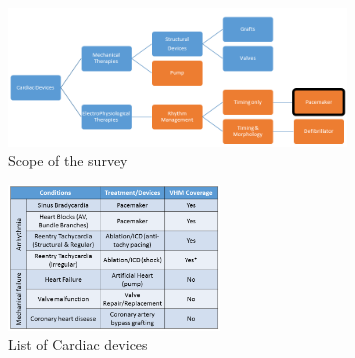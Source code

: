 \begin{itemize}
        
        
        
\end{itemize}


\begin{figure}[!b]
		\centering
		\includegraphics[width=0.8\textwidth]{figs/Fig1.png}
		\caption{\small Scope of the survey}
		\label{fig:scope}
\end{figure}
\begin{figure}[!b]
		\centering
		\includegraphics[width=0.5\textwidth]{figs/devices.png}
		\caption{\small List of Cardiac devices}
		\label{fig:devices}
\end{figure}

